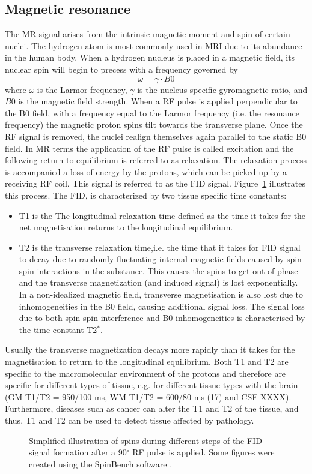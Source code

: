 \subsection*{Magnetic resonance}
The MR signal arises from the intrinsic magnetic moment and spin of certain nuclei. The hydrogen atom is most commonly used in MRI due to its abundance in the
human body. When a hydrogen nucleus is placed in a magnetic field, its nuclear spin will begin to precess with a frequency governed by
\begin{equation}
\omega =\gamma \cdot B0 
\end{equation}
where $\omega$ is the Larmor frequency, $\gamma$ is the nucleus specific gyromagnetic ratio, and $B0$ is the magnetic field strength. When a \gls{RF} pulse is applied perpendicular to the B0 field, with a frequency equal to the Larmor frequency (i.e. the resonance frequency) the magnetic proton spins tilt towards the transverse plane. Once the RF signal is removed, the nuclei realign themselves again parallel to the static B0 field. In MR terms the application of the \gls{RF} pulse is called excitation and the following return to equilibrium is referred to as relaxation. The relaxation process is accompanied a loss of energy by the protons, which can be picked up by a receiving RF coil. This signal is referred to as the \gls{FID} signal. Figure~\ref{fig:chapter2 spin FIDs} illustrates this process. The \gls{FID}, is characterized by two tissue specific time constants:  
\begin{itemize}
	\item T1 is the The longitudinal relaxation time defined as the time it takes for the net magnetisation returns to the longitudinal equilibrium.
	\item T2 is the transverse relaxation time,i.e. the time that it takes for FID signal to decay due to randomly fluctuating internal magnetic fields caused by spin-spin interactions in the substance. This causes the spins to get out of phase and the transverse magnetization (and induced signal) is lost exponentially. In a non-idealized magnetic field, transverse magnetisation is also lost due to inhomogeneities in the B0 field, causing additional signal loss. The signal loss due to both spin-spin interference and B0 inhomogeneities is characterised by the time constant T2$^*$.
\end{itemize}
Usually the transverse magnetization decays more rapidly than it takes for the magnetisation to return to the longitudinal equilibrium. Both T1 and T2 are specific to the macromolecular environment of the protons and therefore are specific for different types of tissue, e.g. for different tissue types with the brain (GM T1/T2 = 950/100 ms, WM T1/T2 = 600/80 ms (17) and CSF XXXX). Furthermore, diseases such as cancer can alter the T1 and T2 of the tissue, and thus, T1 and T2 can be used to detect tissue affected by pathology.
\begin{figure}[ht]
\centering
{}
\caption{Simplified illustration of spins during different steps of the FID signal formation after a 90$^\circ$ RF pulse is applied. Some figures were created using the SpinBench software \citep{Overall:2007}.}
\label{fig:chapter2 spin FIDs}
\end{figure}
